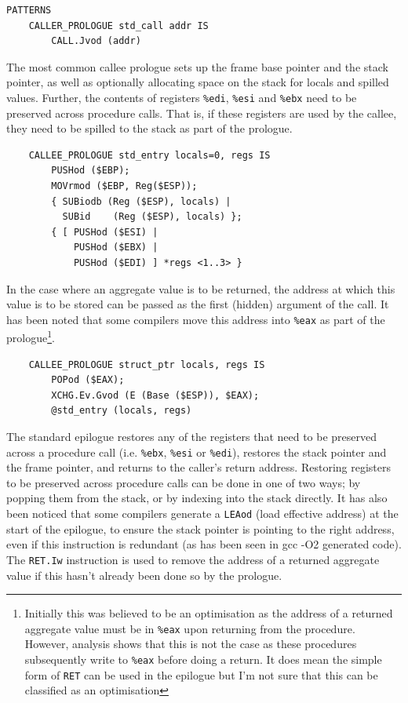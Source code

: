 \begin{verbatim}
PATTERNS
    CALLER_PROLOGUE std_call addr IS
        CALL.Jvod (addr)
\end{verbatim}

The most common callee prologue sets up the frame base pointer and
the stack pointer, as well as optionally allocating space on the
stack for locals and spilled values.  Further, the contents of
registers \texttt{\%edi}, \texttt{\%esi} and \texttt{\%ebx} need to
be preserved across procedure calls.  That is, if these registers are
used by the callee, they need to be spilled to the stack as part of
the prologue. 

\begin{verbatim}
    CALLEE_PROLOGUE std_entry locals=0, regs IS
        PUSHod ($EBP);
        MOVrmod ($EBP, Reg($ESP));
        { SUBiodb (Reg ($ESP), locals) |
          SUBid    (Reg ($ESP), locals) };
        { [ PUSHod ($ESI) |
            PUSHod ($EBX) |
            PUSHod ($EDI) ] *regs <1..3> }
\end{verbatim}

In the case where an aggregate value is to be returned, the address
at which this value is to be stored can be passed as the first
(hidden) argument of the call. It has been noted that some compilers
move this address into {\tt \%eax} as part of the prologue\footnote{
Initially this was believed to be an optimisation as the address of a
returned aggregate value must be in {\tt \%eax} upon returning from
the procedure.  However, analysis shows that this is not the case as
these procedures subsequently write to {\tt \%eax} before doing a
return. It does mean the simple form of {\tt RET} can be used in the
epilogue but I'm not sure that this can be classified as an
optimisation}.

\begin{verbatim}
    CALLEE_PROLOGUE struct_ptr locals, regs IS
        POPod ($EAX);
        XCHG.Ev.Gvod (E (Base ($ESP)), $EAX);
        @std_entry (locals, regs)  
\end{verbatim}

The standard epilogue restores any of the registers that need to be
preserved across a procedure call (i.e. \texttt{\%ebx},
\texttt{\%esi} or \texttt{\%edi}), restores the stack pointer and the
frame pointer, and returns to the caller's return address.  Restoring
registers to be preserved across procedure calls can be done in one
of two ways; by popping them from the stack, or by indexing into the
stack directly.  It has also been noticed that some compilers
generate a \texttt{LEAod} (load effective address) at the start of
the epilogue, to ensure the stack pointer is pointing to the right
address, even if this instruction is redundant (as has been seen in
gcc -O2 generated code). The {\tt RET.Iw} instruction is used to
remove the address of a returned aggregate value if this hasn't
already been done so by the prologue.

